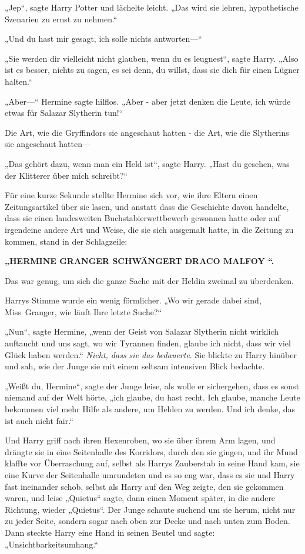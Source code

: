 {„Jep“, sagte Harry Potter und lächelte leicht. „Das wird sie lehren, hypothetische Szenarien zu ernst zu nehmen.“

„Und du hast mir gesagt, ich solle nichts antworten—“

„Sie werden dir vielleicht nicht glauben, wenn du es leugnest“, sagte Harry. „Also ist es besser, nichts zu sagen, es sei denn, du willst, dass sie dich für einen Lügner halten.“

„Aber—“ Hermine sagte hilflos. „Aber - aber jetzt denken die Leute, ich würde etwas für Salazar Slytherin tun!“

Die Art, wie die Gryffindors sie angeschaut hatten - die Art, wie die Slytherins sie angeschaut hatten—

„Das gehört dazu, wenn man ein Held ist“, sagte Harry. „Hast du gesehen, was der Klitterer über mich schreibt?“

Für eine kurze Sekunde stellte Hermine sich vor, wie ihre Eltern einen Zeitungsartikel über sie lasen, und anstatt dass die Geschichte davon handelte, dass sie einen landesweiten Buchstabierwettbewerb gewonnen hatte oder auf irgendeine andere Art und Weise, die sie sich ausgemalt hatte, in die Zeitung zu kommen, stand in der Schlagzeile:

\textbf{„HERMINE GRANGER SCHWÄNGERT DRACO MALFOY “.}

Das war genug, um sich die ganze Sache mit der Heldin zweimal zu überdenken.

Harrys Stimme wurde ein wenig förmlicher. „Wo wir gerade dabei sind, Miss~Granger, wie läuft Ihre letzte Suche?“

„Nun“, sagte Hermine, „wenn der Geist von Salazar Slytherin nicht wirklich auftaucht und uns sagt, wo wir Tyrannen finden, glaube ich nicht, dass wir viel Glück haben werden.“ \emph{Nicht, dass sie das bedauerte}. Sie blickte zu Harry hinüber und sah, wie der Junge sie mit einem seltsam intensiven Blick bedachte.

„Weißt du, Hermine“, sagte der Junge leise, als wolle er sichergehen, dass es sonst niemand auf der Welt hörte, „ich glaube, du hast recht. Ich glaube, manche Leute bekommen viel mehr Hilfe als andere, um Helden zu werden. Und ich denke, das ist auch nicht fair.“

Und Harry griff nach ihren Hexenroben, wo sie über ihrem Arm lagen, und drängte sie in eine Seitenhalle des Korridors, durch den sie gingen, und ihr Mund klaffte vor Überraschung auf, selbst als Harrys Zauberstab in seine Hand kam, sie eine Kurve der Seitenhalle umrundeten und es so eng war, dass es sie und Harry fast ineinander schob, selbst als Harry auf den Weg zeigte, den sie gekommen waren, und leise „Quietus“ sagte, dann einen Moment später, in die andere Richtung, wieder „Quietus“. Der Junge schaute suchend um sie herum, nicht nur zu jeder Seite, sondern sogar nach oben zur Decke und nach unten zum Boden. Dann steckte Harry eine Hand in seinen Beutel und sagte: „Unsichtbarkeitsumhang.“

}
